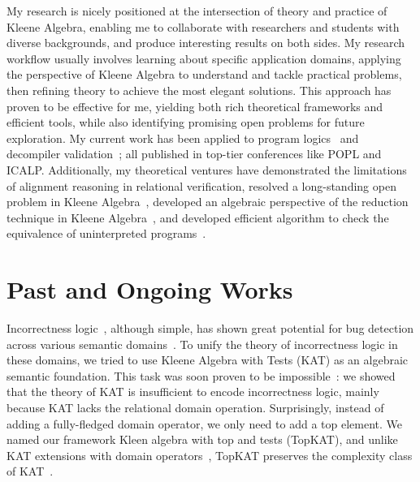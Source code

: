 \documentclass[11pt,a4paper,sans]{moderncv} %
\begin{document}
My research is nicely positioned at the intersection of theory and practice of Kleene Algebra, enabling me to collaborate with researchers and students with diverse backgrounds, and produce interesting results on both sides. 
My research workflow usually involves learning about specific application domains, applying the perspective of Kleene Algebra to understand and tackle practical problems, then refining theory to achieve the most elegant solutions. 
This approach has proven to be effective for me, yielding both rich theoretical frameworks and efficient tools, while also identifying promising open problems for future exploration. 
My current work has been applied to program logics~\cite{zhang_IncorrectnessLogicKleene_2022,zhang_DomainReasoningTopKAT_2024} and decompiler validation~\cite{zhang_CFGKATEfficientValidation_2025}; all published in top-tier conferences like POPL and ICALP. 
Additionally, my theoretical ventures have demonstrated the limitations of alignment reasoning in relational verification, resolved a long-standing open problem in Kleene Algebra~\cite{azevedodeamorim_KleeneAlgebraCommutativity_2024a}, developed an algebraic perspective of the reduction technique in Kleene Algebra~\cite{zhang_DomainReasoningTopKAT_2024}, and developed efficient algorithm to check the equivalence of uninterpreted programs~\cite{zhang_EfficientSymbolicAlgorithms_2025}.

\section{Past and Ongoing Works}


Incorrectness logic~\cite{ohearn_IncorrectnessLogic_2020}, although simple, has shown great potential for bug detection across various semantic domains~\cite{raad_LocalReasoningPresence_2020,le_FindingRealBugs_2022, zhang_QuantitativeStrongestPost_2022b}.
To unify the theory of incorrectness logic in these domains, we tried to use Kleene Algebra with Tests (KAT) as an algebraic semantic foundation. 
This task was soon proven to be impossible~\cite{zhang_IncorrectnessLogicKleene_2022}: we showed that the theory of KAT is insufficient to encode incorrectness logic, mainly because KAT lacks the relational domain operation.
Surprisingly, instead of adding a fully-fledged domain operator, we only need to add a top element.
We named our framework Kleen algebra with top and tests (TopKAT), and unlike KAT extensions with domain operators~\cite{desharnais_KleeneAlgebraDomain_2006,sedlar_ComplexityKleeneAlgebra_2023}, TopKAT preserves the complexity class of KAT~\cite{zhang_IncorrectnessLogicKleene_2022}.
\end{document}
